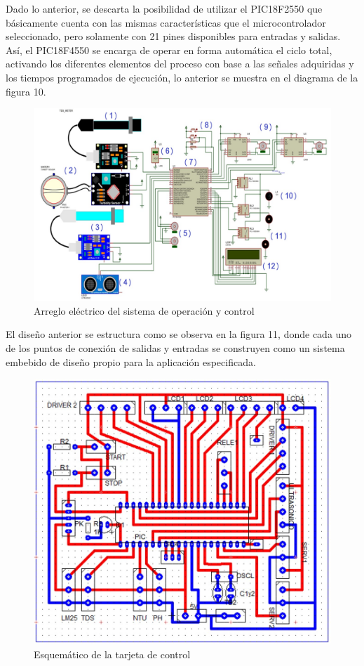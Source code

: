\documentclass[conference]{IEEEtran}
\begin{document}
Dado lo anterior, se descarta la posibilidad de utilizar el PIC18F2550 que básicamente cuenta con las mismas características que el microcontrolador seleccionado, pero solamente con 21 pines disponibles para entradas y salidas. Así, el PIC18F4550 se encarga de operar en forma automática el ciclo total, activando los diferentes elementos del proceso con base a las señales adquiridas y los tiempos programados de ejecución, lo anterior se muestra en el diagrama de la figura 10.

\begin{figure}[htbp]
	\centering
	\includegraphics[width=0.8\columnwidth]{fig10.jpg}
	\caption{Arreglo eléctrico del sistema de operación y control}
	\label{fig:arreglo-electrico}
\end{figure}
		
El diseño anterior se estructura como se observa en la figura 11, donde cada uno de los puntos de conexión de salidas y entradas se construyen como un sistema embebido de diseño propio para la aplicación especificada.

\begin{figure}[htbp]
	\centering
	\includegraphics[width=0.8\columnwidth]{fig11.jpg}
	\caption{Esquemático de la tarjeta de control}
	\label{fig:esquematico-tarjeta}
\end{figure}
\end{document}
